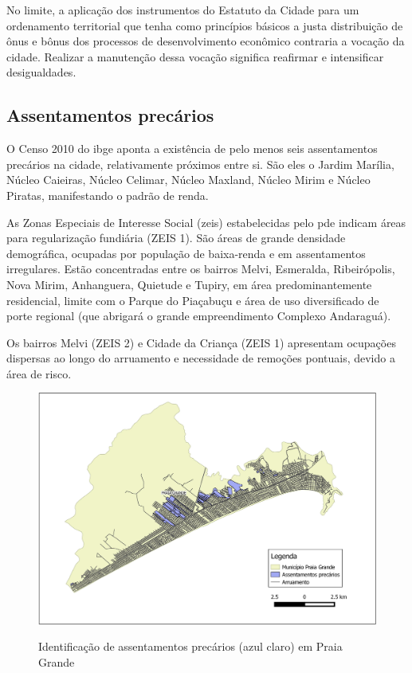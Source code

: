 	No limite, a aplicação dos instrumentos do Estatuto da Cidade para um ordenamento territorial que tenha como princípios básicos a justa distribuição de ônus e bônus dos processos de desenvolvimento econômico contraria a vocação da cidade. Realizar a manutenção dessa vocação significa reafirmar e intensificar desigualdades.	
	
	\subsection{Assentamentos precários}
	
	O Censo 2010 do \gls{ibge} aponta a existência de pelo menos seis assentamentos precários na cidade, relativamente próximos entre si. São eles o Jardim Marília, Núcleo Caieiras, Núcleo Celimar, Núcleo Maxland, Núcleo Mirim e Núcleo Piratas, manifestando o padrão de renda. 
	
	As Zonas Especiais de Interesse Social (\gls{zeis}) estabelecidas pelo \gls{pde} indicam áreas para regularização fundiária (ZEIS 1). São áreas de grande densidade demográfica, ocupadas por população de baixa-renda e em assentamentos irregulares. Estão concentradas entre os bairros Melvi, Esmeralda, Ribeirópolis, Nova Mirim, Anhanguera, Quietude e Tupiry, em área predominantemente residencial, limite com o Parque do Piaçabuçu e área de uso diversificado de porte regional (que abrigará o grande empreendimento Complexo Andaraguá).
	
	Os bairros Melvi (ZEIS 2) e Cidade da Criança (ZEIS 1) apresentam ocupações dispersas ao longo do arruamento e necessidade de remoções pontuais, devido a área de risco.
	
	\begin{figure}[h]
		\centering
		\caption{Identificação de assentamentos precários (azul claro) em Praia Grande}
		\includegraphics[width=1\textwidth]{img/Assentamentos_precarios_atualizado.jpg}
		\label{mapa_favelas}
	\end{figure}
	
